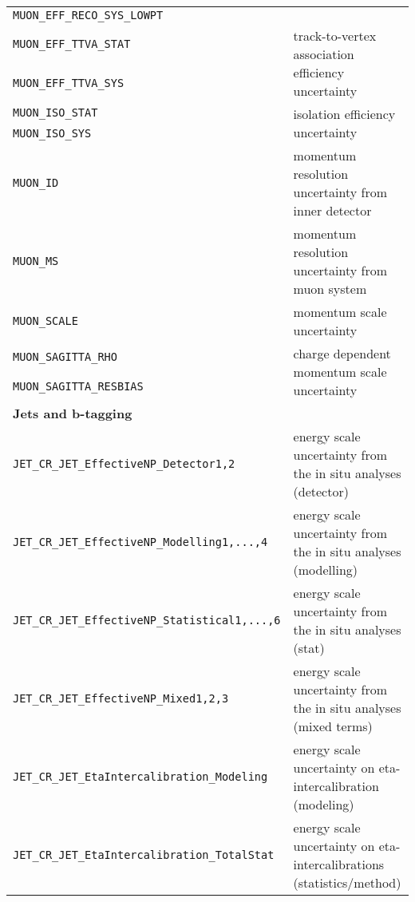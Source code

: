 \begin{table}
{\begin{tabular}{ll}
      \texttt{MUON\_EFF\_RECO\_SYS\_LOWPT} &  \\
      \texttt{MUON\_EFF\_TTVA\_STAT} &  \multirow{2}{*}{track-to-vertex association efficiency uncertainty} \\
      \texttt{MUON\_EFF\_TTVA\_SYS} &                      \\
      \texttt{MUON\_ISO\_STAT} &  \multirow{2}{*}{isolation efficiency uncertainty} \\
      \texttt{MUON\_ISO\_SYS} &                     \\
      \texttt{MUON\_ID} & momentum resolution uncertainty from inner detector        \\
      \texttt{MUON\_MS} &  momentum resolution uncertainty from muon system        \\
      \texttt{MUON\_SCALE} &   momentum scale uncertainty         \\
      \texttt{MUON\_SAGITTA\_RHO} & \multirow{2}{*}{charge dependent momentum scale uncertainty} \\
      \texttt{MUON\_SAGITTA\_RESBIAS} &  \\
      {\bfseries Jets and $\bm{b}$-tagging}&\\
      \texttt{JET\_CR\_JET\_EffectiveNP\_Detector1,2} & energy scale uncertainty from the in situ analyses (detector) \\%
      \texttt{JET\_CR\_JET\_EffectiveNP\_Modelling1,...,4} & energy scale uncertainty from the in situ analyses (modelling) \\%
      \texttt{JET\_CR\_JET\_EffectiveNP\_Statistical1,...,6} & energy scale uncertainty from the in situ analyses (stat) \\%
      \texttt{JET\_CR\_JET\_EffectiveNP\_Mixed1,2,3} & energy scale uncertainty from the in situ analyses (mixed terms) \\%
      \texttt{JET\_CR\_JET\_EtaIntercalibration\_Modeling} & energy scale uncertainty on eta-intercalibration (modeling)\\%
      \texttt{JET\_CR\_JET\_EtaIntercalibration\_TotalStat} & energy scale uncertainty on eta-intercalibrations (statistics/method) \\%

\end{tabular}}
\end{table}
